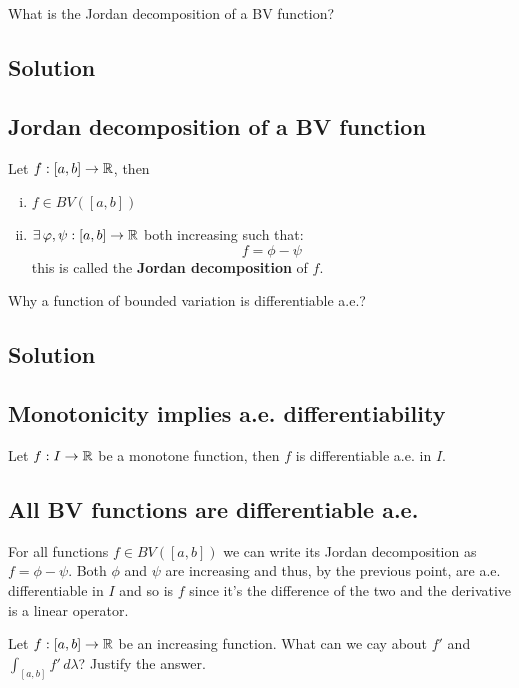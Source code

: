 
\question
What is the Jordan decomposition of a BV function?

\subsection*{Solution}

\subsection{Jordan decomposition of a BV function}
Let $f:[a,b]\to\mathbb{R}$, then \tfae
\begin{enumerate}[i)]
    \item $f \in BV([a,b])$
    \item $\exists \, \varphi, \psi : [a,b]\to\mathbb{R}$ both increasing such that:
        \[
            f = \phi - \psi    
        \]
        this is called the \textbf{Jordan decomposition} of $f$.
\end{enumerate}


\question
Why a function of bounded variation is differentiable a.e.?

\subsection*{Solution}

\subsection{Monotonicity implies a.e. differentiability}
Let $f:I\to\mathbb{R}$ be a monotone function, then $f$ is differentiable a.e. in $I$.

\subsection{All BV functions are differentiable a.e.}
For all functions $f \in BV([a,b])$ we can write its Jordan decomposition as $f = \phi - \psi$. Both $\phi$ and $\psi$ are increasing and thus, by the previous point, are a.e. differentiable in $I$ and so is $f$ since it's the difference of the two and the derivative is a linear operator.


\question
Let $f : [a, b] \to \mathbb{R}$ be an increasing function. What can we cay about $f'$ and $\int_{[a,b]}f' \, d\lambda$? Justify the answer.

